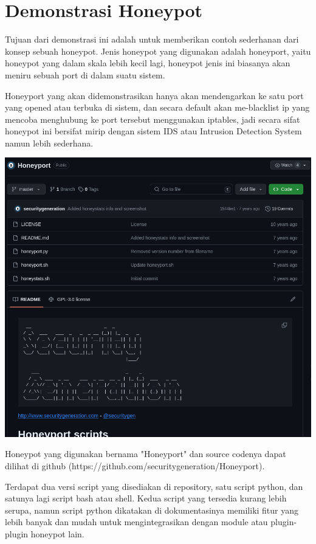 \documentclass[12pt, a4paper]{article}
\begin{document}
  \section*{Demonstrasi Honeypot}

  Tujuan dari demonstrasi ini adalah untuk memberikan contoh sederhanan dari
  konsep sebuah honeypot. Jenis honeypot yang digunakan adalah honeyport, yaitu
  honeypot yang dalam skala lebih kecil lagi, honeypot jenis ini biasanya akan
  meniru sebuah port di dalam suatu sistem.

  Honeyport yang akan didemonstrasikan hanya akan mendengarkan ke satu port yang
  opened atau terbuka di sistem, dan secara default akan me-blacklist ip yang
  mencoba menghubung ke port tersebut menggunakan iptables, jadi secara sifat honeypot ini bersifat
  mirip dengan sistem IDS atau Intrusion Detection System namun lebih sederhana.

  \begin{center}
    \includegraphics[scale=0.4]{HONEYPORTPAGE}
  \end{center}

  Honeypot yang digunakan bernama "Honeyport" dan source codenya dapat dilihat di github
  (https://github.com/securitygeneration/Honeyport).

  Terdapat dua versi script yang disediakan di repository, satu script python, dan
  satunya lagi script bash atau shell. Kedua script yang tersedia kurang lebih
  serupa, namun script python dikatakan di dokumentasinya memiliki fitur yang
  lebih banyak dan mudah untuk mengintegrasikan dengan module atau plugin-plugin
  honeypot lain.
\end{document}

